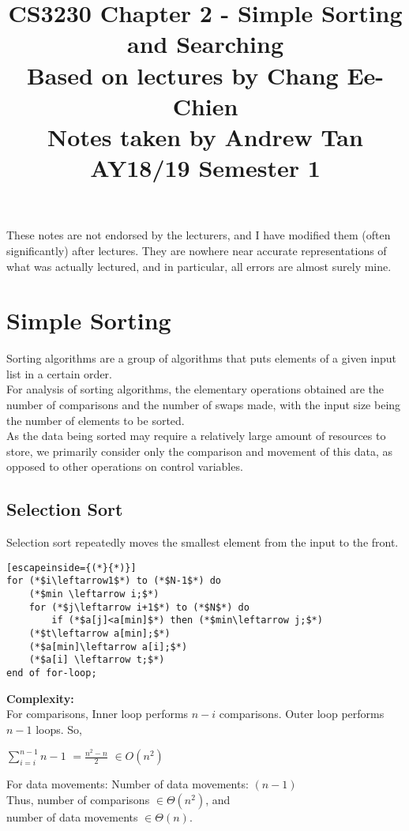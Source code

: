 \documentclass[a4paper]{article}
\title{%
	CS3230 Chapter 2 - Simple Sorting and Searching \\
	\large Based on lectures by Chang Ee-Chien
	\\ Notes taken by Andrew Tan
	\\ AY18/19 Semester 1
	\\ }
\author{}
\date{\vspace{-5ex}}
\begin{document}
\maketitle

\begin{center}\begin{minipage}[c]{0.9\textwidth}\centering\footnotesize These notes are not endorsed by the lecturers, and I have modified them (often significantly) after lectures. They are nowhere near accurate representations of what was actually lectured, and in particular, all errors are almost surely mine.\end{minipage}\end{center}

\section{Simple Sorting}
Sorting algorithms are a group of algorithms that puts elements of a given input list in a certain order.\\
For analysis of sorting algorithms, the elementary operations obtained are the number of comparisons and the number of swaps made, with the input size being the number of elements to be sorted.\\ 
As the data being sorted may require a relatively large amount of resources to store, we primarily consider only the comparison and movement of this data, as opposed to other operations on control variables.

\subsection{Selection Sort}
Selection sort repeatedly moves the smallest element from the input to the front.

\begin{lstlisting}[escapeinside={(*}{*)}]
for (*$i\leftarrow1$*) to (*$N-1$*) do
	(*$min \leftarrow i;$*)
	for (*$j\leftarrow i+1$*) to (*$N$*) do
		if (*$a[j]<a[min]$*) then (*$min\leftarrow j;$*)
	(*$t\leftarrow a[min];$*)
	(*$a[min]\leftarrow a[i];$*)
	(*$a[i] \leftarrow t;$*)
end of for-loop;
\end{lstlisting}
\textbf{Complexity:}\\
For comparisons,
Inner loop performs $n-i$ comparisons.
Outer loop performs $n-1$ loops.
So,
\begin{center}
	$\sum_{i=i}^{n-1}n-1$
	$=\frac{n^2-n}{2}$
	$\in O(n^2)$
\end{center}
For data movements:
Number of data movements: $(n-1)$\\
Thus, number of comparisons $\in \Theta(n^2)$, and\\
number of data movements $\in \Theta(n)$.
\end{document}
